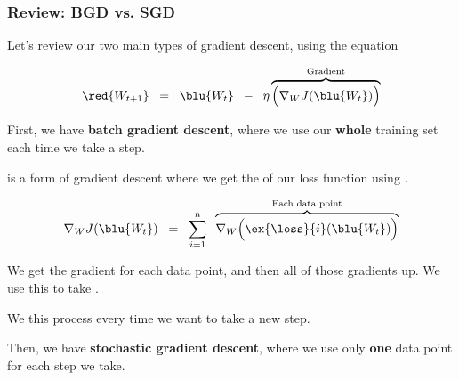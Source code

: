         \subsubsection{Review: BGD vs. SGD}
        
            Let's review our two main types of gradient descent, using the equation
            
            \begin{equation}
                \red{ W_{t+1} } 
                \;\;=\;\;
                \blu{ W_t }
                \;\;-\;\;
                \eta
                \overbrace{
                    \Big(
                        \nabla_W J ( \blu{ W_t } )
                    \Big)
                }^{\text{Gradient}}
            \end{equation}
            
            First, we have \textbf{batch gradient descent}, where we use our \textbf{whole} training set each time we take a step.\\
            
            \begin{definition}
                 is a form of gradient descent where we get the  of our loss function using .
                
                \begin{equation*}
                    \nabla_W J ( \blu{ W_t } )
                    \;\;=\;\;
                    \sum_{i=1}^n
                    \;\;
                    \overbrace{
                        \nabla_W
                        \Big(
                            \ex{\loss}{i}(\blu{ W_t })
                        \Big)
                    }^{\text{Each data point}}
                \end{equation*}
                
                We get the gradient for each data point, and then  all of those gradients up. We use this  to take .
                
                We  this process every time we want to take a new step.
            \end{definition}
            
            Then, we have \textbf{stochastic gradient descent}, where we use only \textbf{one} data point for each step we take.\\
            
